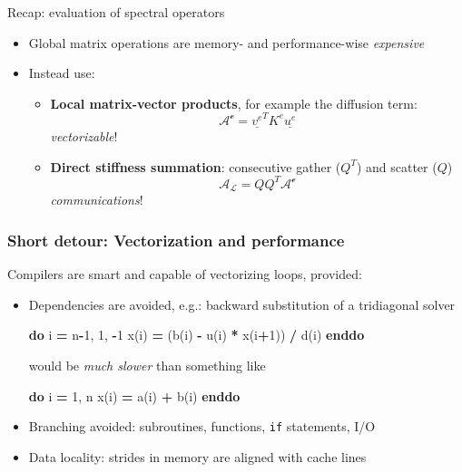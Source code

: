 \documentclass[
]{scrartcl}
\newenvironment{Shaded}{}{}
\newcommand{\DecValTok}[1]{\textcolor[rgb]{0.25,0.63,0.44}{#1}}
\newcommand{\KeywordTok}[1]{\textcolor[rgb]{0.00,0.44,0.13}{\textbf{#1}}}
\newcommand{\NormalTok}[1]{#1}
\providecommand{\tightlist}{%
  \setlength{\itemsep}{0pt}\setlength{\parskip}{0pt}}
\begin{document}
Recap: evaluation of spectral operators

\begin{itemize}
\tightlist
\item
  Global matrix operations are memory- and performance-wise
  \emph{expensive}
\item
  Instead use:

  \begin{itemize}
  \tightlist
  \item
    \textbf{Local matrix-vector products}, for example the diffusion
    term: \[\mathcal{A^e}=\underline{v^e}^{T}K^e\underline{u^e}\]
    \emph{vectorizable}!
  \item
    \textbf{Direct stiffness summation}: consecutive gather (\(Q^T\))
    and scatter (\(Q\)) \[\mathcal{A_L} = Q Q^T \mathcal{A^e}\]
    \emph{communications}!
  \end{itemize}
\end{itemize}

\hypertarget{short-detour-vectorization-and-performance}{%
\subsubsection{Short detour: Vectorization and
performance}\label{short-detour-vectorization-and-performance}}

Compilers are smart and capable of vectorizing loops, provided:

\begin{itemize}
\item
  Dependencies are avoided, e.g.: backward substitution of a tridiagonal
  solver

\begin{Shaded}
\begin{Highlighting}[]
\KeywordTok{do}\NormalTok{ i }\KeywordTok{=}\NormalTok{ n}\KeywordTok{{-}}\DecValTok{1}\NormalTok{, }\DecValTok{1}\NormalTok{, }\KeywordTok{{-}}\DecValTok{1}
\NormalTok{   x(i) }\KeywordTok{=}\NormalTok{ (b(i) }\KeywordTok{{-}}\NormalTok{ u(i) }\KeywordTok{*}\NormalTok{ x(i}\KeywordTok{+}\DecValTok{1}\NormalTok{)) }\KeywordTok{/}\NormalTok{ d(i)}
\KeywordTok{enddo}
\end{Highlighting}
\end{Shaded}

  would be \emph{much slower} than something like

\begin{Shaded}
\begin{Highlighting}[]
\KeywordTok{do}\NormalTok{ i }\KeywordTok{=} \DecValTok{1}\NormalTok{, n}
\NormalTok{   x(i) }\KeywordTok{=}\NormalTok{ a(i) }\KeywordTok{+}\NormalTok{ b(i)}
\KeywordTok{enddo}
\end{Highlighting}
\end{Shaded}
\item
  Branching avoided: subroutines, functions, \texttt{if} statements, I/O
\item
  Data locality: strides in memory are aligned with cache lines
\end{itemize}
\end{document}

